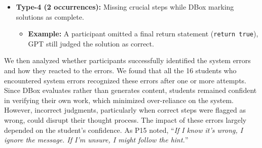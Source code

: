 {\begin{itemize}[leftmargin=0em]
    \item \textbf{Type-4 (2 occurrences):} Missing crucial steps while DBox marking solutions as complete.  
    \begin{itemize}
        \item \textbf{Example:} A participant omitted a final return statement (\texttt{return true}), GPT still judged the solution as correct.  
    \end{itemize}

\end{itemize}
}











We then analyzed whether participants successfully identified the system errors and how they reacted to the errors. We found that all the 16 students who encountered system errors recognized these errors after one or more attempts. Since DBox evaluates rather than generates content, students remained confident in verifying their own work, which minimized over-reliance on the system. However, incorrect judgments, particularly when correct steps were flagged as wrong, could disrupt their thought process. The impact of these errors largely depended on the student's confidence. As P15 noted, “\emph{If I know it's wrong, I ignore the message. If I'm unsure, I might follow the hint.}''

